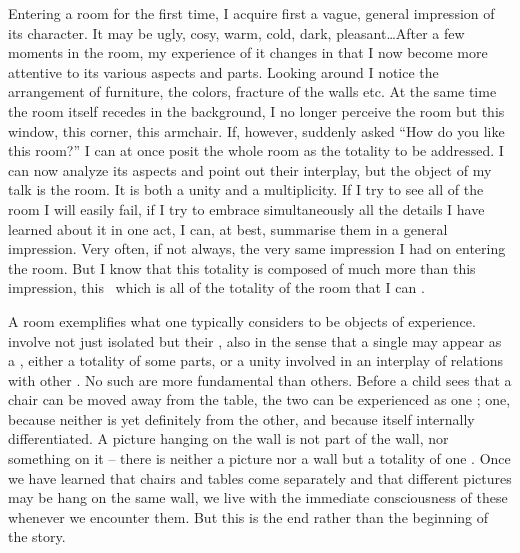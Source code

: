  \pa\label{th:complact} Entering a room for the first time, I
acquire first a vague, general impression of its character. It may be ugly,
cosy, warm, cold, dark, pleasant\ldots After a few moments in the room, my
experience of it changes in that I now become more attentive to its various
aspects and parts. Looking around I notice the arrangement of furniture, the
colors, fracture of the walls etc. At the same time the room itself recedes in
the background, I no longer perceive the room but this window, this corner, this
armchair.  If, however, suddenly asked ``How do you like this room?'' I can at
once posit the whole room as the totality to be addressed. I can now analyze its
aspects and point out their interplay, but the object of my talk is the room. It
is both a unity and a multiplicity. If I try to see all of the room I will
easily fail, if I try to embrace simultaneously all the details I have learned
about it in one act, I can, at best, summarise them in a general impression.
Very often, if not always, the very same impression I had on entering the
room. But I know that this totality is composed of much more than this
impression, this \os\ which is all of the totality of the room that I can
.

A room exemplifies what one typically considers to be objects of experience.
 involve not just isolated  but their
, also in the sense that a single  may appear as a
, either a totality of some parts, or a unity involved in an
interplay of relations with other .  No such  are more
fundamental than others.  Before a child sees that a chair can be moved away
from the table, the two can be experienced as one ; one, because
neither is yet definitely  from the other, and 
because itself internally differentiated.  A picture hanging on the wall is not
part of the wall, nor something on it -- there is neither a picture nor a wall
but a totality of one . Once we have learned that chairs and tables
come separately and that different pictures may be hang on the same wall, we
live with the immediate consciousness of these  whenever we
encounter them. But this is the end rather than the beginning of the story.


